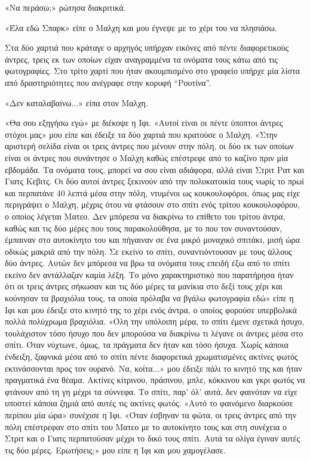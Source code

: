 \documentclass[12pt,twoside, openany]{book}
\begin{document}
«Να περάσω;» ρώτησα διακριτικά.

«Έλα εδώ Σπαρκ» είπε ο Μαλχη και μου έγνεψε με το χέρι του να πλησιάσω.

Στα δύο χαρτιά που κράταγε ο αρχηγός υπήρχαν εικόνες από πέντε διαφορετικούς άντρες, τρεις εκ των οποίων είχαν αναγραμμένα τα ονόματα τους κάτω από τις φωτογραφίες. Στο τρίτο χαρτί που ήταν ακουμπισμένο στο γραφείο υπήρχε μία λίστα από δραστηριότητες που ανέγραφε στην κορυφή “Ρουτίνα”.

«Δεν καταλαβαίνω...» είπα στον Μαλχη.

«Θα σου εξηγήσω εγώ» με διέκοψε η Ιφι. «Αυτοί είναι οι πέντε ύποπτοι άντρες στόχοι μας» μου είπε και έδειξε τα δύο χαρτιά που κρατούσε ο Μαλχη. «Στην αριστερή σελίδα είναι οι τρεις άντρες που μένουν στην πόλη, οι δύο εκ των οποίων είναι οι άντρες που συνάντησε ο Μαλχη καθώς επέστρεφε από το καζίνο πριν μία εβδομάδα. Τα ονόματα τους, μπορεί να σου είναι αδιάφορα, αλλά είναι Στριτ Ρατ και Γιατς Κεβιτς. Οι δύο αυτοί άντρες ξεκινούν από την πολυκατοικία τους νωρίς το πρωί και περπατάνε 40 λεπτά μέσα στην πόλη, ντυμένοι ως κουκουλοφόροι, όπως μας είχε περιγράψει ο Μαλχη, μέχρις ότου να φτάσουν στο σπίτι ενός τρίτου κουκουλοφόρου, ο οποίος λέγεται Ματεο. Δεν μπόρεσα να διακρίνω το επίθετο του τρίτου άντρα, καθώς και τις δύο μέρες που τους παρακολούθησα, με το που τον συναντούσαν, έμπαιναν στο αυτοκίνητο του και πήγαιναν σε ένα μικρό μοναχικό σπιτάκι, μισή ώρα οδικώς μακριά από την πόλη. Σε εκείνο το σπίτι, συναντιόντουσαν με τους άλλους δύο άντρες. Αυτών δεν μπόρεσα να βρω τα ονόματα τους επειδή έξω από το σπίτι εκείνο δεν αντάλλαζαν καμία λέξη. Το μόνο χαρακτηριστικό που παρατήρησα ήταν ότι οι τρεις άντρες σήκωσαν και τις δύο μέρες τα μανίκια στο δεξί τους χέρι και κούνησαν τα βραχιόλια τους, τα οποία πρόλαβα να βγάλω φωτογραφία εδώ» είπε η Ιφι και μου έδειξε στο κινητό της το χέρι ενός άντρα, ο οποίος φορούσε υπερβολικά πολλά πολύχρωμα βραχιόλια. «Όλη την υπόλοιπη μέρα, το σπίτι έμενε σχετικά ήσυχο, τουλάχιστον τόσο ήσυχο που δεν μπορούσα να διακρίνω τι λέγανε οι άντρες μέσα στο σπίτι. Όταν νύχτωνε, όμως, τα πράγματα δεν ήταν και τόσο ήσυχα. Χωρίς κάποια ένδειξη, ξαφνικά μέσα από το σπίτι πέντε διαφορετικά χρωματισμένες ακτίνες φωτός εκτινάσσονται προς τον ουρανό. Να, κοίτα...» μου έδειξε πάλι το κινητό της και ήταν πραγματικά ένα θέαμα. Ακτίνες κίτρινου, πράσινου, μπλε, κόκκινου και γκρι φωτός να φτάνουν από τη γη μέχρι τα σύννεφα. Το σπίτι, παρ’ όλ’ αυτά, δεν φαινόταν να είχε υποστεί κάποια ζημιά από αυτές τις ακτίνες φωτός. «Αυτό το φαινόμενο διαρκούσε περίπου μία ώρα» συνέχισε η Ιφι. «Όταν έσβηναν τα φώτα, οι τρεις άντρες από την πόλη επέστρεφαν στο σπίτι του Ματεο με το αυτοκίνητο τους και στη συνέχεια ο Στριτ και ο Γιατς περπατούσαν μέχρι το δικό τους σπίτι. Αυτά τα ολίγα έγιναν αυτές τις δύο μέρες. Ερωτήσεις;» μου είπε η Ιφι και μου χαμογέλασε.
\end{document}
